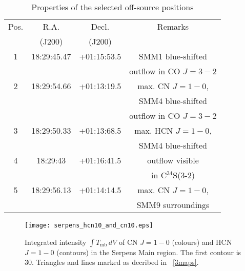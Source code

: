 \documentclass{aa}
\begin{document}
\begin{table}
\caption{Properties of the selected off-source positions}             %
\label{table:3}      %
\centering                          %
\begin{tabular}{c c c c} 
\hline\hline 
Pos. & R.A. & Decl. & Remarks\\
 & (J200) & (J200) & \\
\hline
1 & 18:29:45.47 & +01:15:53.5 & SMM1 blue-shifted \\
 & & & outflow in CO $J=3-2$\\
\hline
2 & 18:29:54.66 & +01:13:19.5 & max. CN $J=1-0$, \\
 & & & SMM4 blue-shifted \\
 & & & outflow in CO $J=3-2$\\
\hline
3 & 18:29:50.33 & +01:13:68.5 & max. HCN $J=1-0$, \\
 & & & SMM4 blue-shifted \\
\hline
4 & 18:29:43 & +01:16:41.5 & outflow visible \\
 & & &  in C$^{34}$S(3-2)\\
\hline
5 & 18:29:56.13 & +01:14:14.5 & max. CN $J=1-0$, \\
 & & & SMM9 surroundings\\
\hline
\end{tabular}
\end{table}


\begin{figure}
   \centering
   \texttt{[image: serpens\_hcn10\_and\_cn10.eps]}
      \caption{Integrated intensity $\int T_\mathrm{mb}\, dV$ of CN $J=1-0$ (colours) and HCN $J=1-0$ (contours) in the Serpens Main region. The first contour is 30. Triangles and lines marked as decribed in ~\ref{3maps}.}
         \label{cn10_and_hcn10}
   \end{figure}
\end{document}
